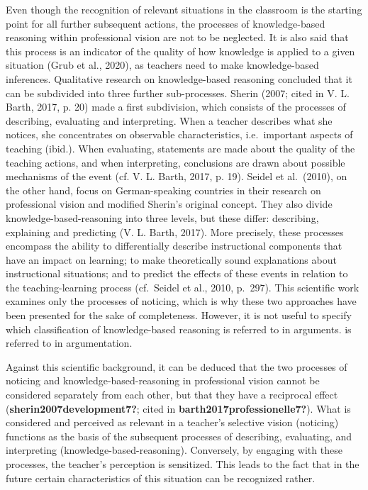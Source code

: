 \documentclass[
  man]{apa6}
\begin{document}
Even though the recognition of relevant situations in the classroom is the starting point for all further subsequent actions, the processes of knowledge-based reasoning within professional vision are not to be neglected. It is also said that this process is an indicator of the quality of how knowledge is applied to a given situation (Grub et al., 2020), as teachers need to make knowledge-based inferences. Qualitative research on knowledge-based reasoning concluded that it can be subdivided into three further sub-processes. Sherin (2007; cited in V. L. Barth, 2017, p. 20) made a first subdivision, which consists of the processes of describing, evaluating and interpreting. When a teacher describes what she notices, she concentrates on observable characteristics, i.e.~important aspects of teaching (ibid.). When evaluating, statements are made about the quality of the teaching actions, and when interpreting, conclusions are drawn about possible mechanisms of the event (cf. V. L. Barth, 2017, p. 19). Seidel et al.~(2010), on the other hand, focus on German-speaking countries in their research on professional vision and modified Sherin's original concept. They also divide knowledge-based-reasoning into three levels, but these differ: describing, explaining and predicting (V. L. Barth, 2017). More precisely, these processes encompass the ability to differentially describe instructional components that have an impact on learning; to make theoretically sound explanations about instructional situations; and to predict the effects of these events in relation to the teaching-learning process (cf.~Seidel et al., 2010, p.~297). This scientific work examines only the processes of noticing, which is why these two approaches have been presented for the sake of completeness. However, it is not useful to specify which classification of knowledge-based reasoning is referred to in arguments. is referred to in argumentation.

Against this scientific background, it can be deduced that the two processes of noticing and knowledge-based-reasoning in professional vision cannot be considered separately from each other, but that they have a reciprocal effect (\textbf{sherin2007development7?}; cited in \textbf{barth2017professionelle7?}). What is considered and perceived as relevant in a teacher's selective vision (noticing) functions as the basis of the subsequent processes of describing, evaluating, and interpreting (knowledge-based-reasoning). Conversely, by engaging with these processes, the teacher's perception is sensitized. This leads to the fact that in the future certain characteristics of this situation can be recognized rather.
\end{document}
